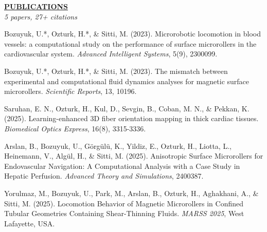 \documentclass{article}
\newlength{\remaining}
\renewcommand{\section}[1]{
  \vspace{1.0em}\setlength{\remaining}{\textwidth-\widthof{\uppercase{#1}}}
    \noindent\underline{\fontsize{10}{15}\bfseries\uppercase{#1}\hspace*{\remaining}} \\
}
\begin{document}
\newpage

\section{Publications}
\noindent\textit{5 papers, 27+ citations}
\vspace{0.75em}

Bozuyuk, U.*, Ozturk, H.*, \& Sitti, M. (2023). Microrobotic locomotion in blood vessels: a computational study on the performance of surface microrollers in the cardiovascular system. \textit{Advanced Intelligent Systems}, 5(9), 2300099.

\vspace{0.5em}

Bozuyuk, U.*, Ozturk, H.*, \& Sitti, M. (2023). The mismatch between experimental and computational fluid dynamics analyses for magnetic surface microrollers. \textit{Scientific Reports}, 13, 10196.

\vspace{0.5em}

Saruhan, E. N., Ozturk, H., Kul, D., Sevgin, B., Coban, M. N., \& Pekkan, K. (2025). Learning-enhanced 3D fiber orientation mapping in thick cardiac tissues. \textit{Biomedical Optics Express}, 16(8), 3315-3336.

\vspace{0.5em}

Arslan, B., Bozuyuk, U., Görgülü, K., Yildiz, E., Ozturk, H., Liotta, L., Heinemann, V., Algül, H., \& Sitti, M. (2025). Anisotropic Surface Microrollers for Endovascular Navigation: A Computational Analysis with a Case Study in Hepatic Perfusion. \textit{Advanced Theory and Simulations}, 2400387.

\vspace{0.5em}

Yorulmaz, M., Bozuyuk, U., Park, M., Arslan, B., Ozturk, H., Aghakhani, A., \& Sitti, M. (2025). Locomotion Behavior of Magnetic Microrollers in Confined Tubular Geometries Containing Shear-Thinning Fluids. \textit{MARSS 2025}, West Lafayette, USA.
\end{document}
